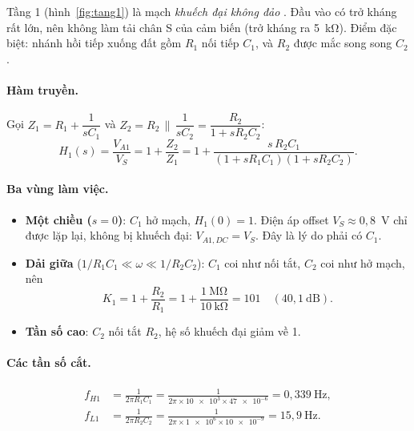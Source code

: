 Tầng 1 (hình~\ref{fig:tang1}) là mạch \emph{khuếch đại không đảo} \cite{sedra}. Đầu vào có trở kháng rất lớn, nên không làm tải chân S của cảm biến (trở kháng ra 5~kΩ). Điểm đặc biệt: nhánh hồi tiếp xuống đất gồm $R_1$ nối tiếp $C_1$, và $R_2$ được mắc song song $C_2$.

\paragraph{Hàm truyền.} Gọi $Z_1 = R_1 + \dfrac{1}{sC_1}$ và $Z_2 = R_2 \,\|\, \dfrac{1}{sC_2} = \dfrac{R_2}{1+sR_2C_2}$:
\begin{equation}
  H_1(s) = \frac{V_{A1}}{V_S} = 1 + \frac{Z_2}{Z_1} = 1 + \frac{s\,R_2C_1}{(1+sR_1C_1)(1+sR_2C_2)} .
  \label{eq:H1}
\end{equation}

\paragraph{Ba vùng làm việc.}
\begin{itemize}
  \item \textbf{Một chiều ($s = 0$)}: $C_1$ hở mạch, $H_1(0) = 1$. Điện áp offset $V_S \approx 0{,}8$~V chỉ được lặp lại, không bị khuếch đại: $V_{A1,DC} = V_S$. Đây là lý do phải có $C_1$.
  \item \textbf{Dải giữa} ($1/R_1C_1 \ll \omega \ll 1/R_2C_2$): $C_1$ coi như nối tắt, $C_2$ coi như hở mạch, nên
  \begin{equation}
    K_1 = 1 + \frac{R_2}{R_1} = 1 + \frac{1~\text{MΩ}}{10~\text{kΩ}} = 101 \quad (40{,}1~\text{dB}).
  \end{equation}
  \item \textbf{Tần số cao}: $C_2$ nối tắt $R_2$, hệ số khuếch đại giảm về 1.
\end{itemize}

\paragraph{Các tần số cắt.}
\begin{align}
  f_{H1} &= \frac{1}{2\pi R_1C_1} = \frac{1}{2\pi\times\num{10e3}\times\num{47e-6}} = 0{,}339~\text{Hz}, \label{eq:fH1}\\
  f_{L1} &= \frac{1}{2\pi R_2C_2} = \frac{1}{2\pi\times\num{1e6}\times\num{10e-9}} = 15{,}9~\text{Hz}. \label{eq:fL1}
\end{align}

